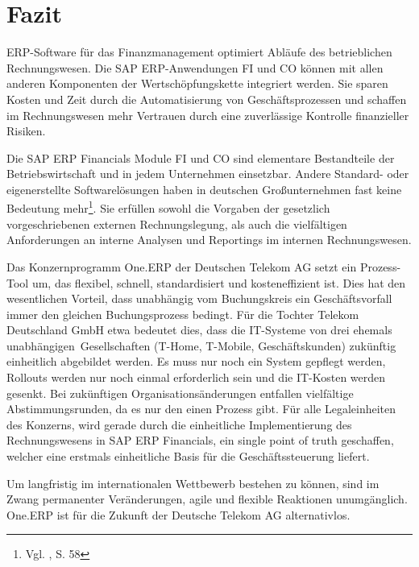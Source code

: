 \section{Fazit}
ERP-Software für das Finanzmanagement optimiert Abläufe des betrieblichen Rechnungswesen. Die SAP ERP-Anwendungen FI und CO können mit allen anderen Komponenten der Wertschöpfungskette integriert werden. Sie sparen Kosten und Zeit durch die Automatisierung von Geschäftsprozessen und schaffen im Rechnungswesen mehr Vertrauen durch eine zuverlässige Kontrolle finanzieller Risiken. 

Die SAP ERP Financials Module FI und CO sind elementare Bestandteile der Betriebswirtschaft und in jedem Unternehmen einsetzbar. Andere  Standard- oder eigenerstellte Softwarelösungen haben in deutschen Großunternehmen fast keine Bedeutung mehr\footnote{Vgl. \cite{Gleich2010}, S. 58}. Sie erfüllen sowohl die Vorgaben der gesetzlich vorgeschriebenen externen Rechnungslegung, als auch die vielfältigen Anforderungen an interne Analysen und Reportings im internen Rechnungswesen. 

Das Konzernprogramm One.ERP der Deutschen Telekom AG setzt ein Prozess-Tool um, das flexibel, schnell, standardisiert und kosteneffizient ist. Dies hat den wesentlichen Vorteil, dass unabhängig vom Buchungskreis ein Geschäftsvorfall immer den gleichen Buchungsprozess bedingt. Für die Tochter Telekom Deutschland GmbH etwa bedeutet dies, dass die IT-Systeme von drei ehemals \glqq unabhängigen\grqq \ Gesellschaften (T-Home, T-Mobile, Geschäftskunden) zukünftig einheitlich abgebildet werden. Es muss nur noch ein System gepflegt werden, Rollouts werden nur noch einmal erforderlich sein und die IT-Kosten werden gesenkt. Bei zukünftigen Organisationsänderungen entfallen vielfältige Abstimmungsrunden, da es nur den einen Prozess gibt. Für alle Legaleinheiten des Konzerns, wird gerade durch die einheitliche Implementierung des Rechnungswesens in SAP ERP Financials, ein single point of truth geschaffen, welcher eine erstmals einheitliche Basis für die Geschäftssteuerung liefert.

Um langfristig im internationalen Wettbewerb bestehen zu können, sind im Zwang permanenter Veränderungen, agile und flexible Reaktionen unumgänglich. One.ERP ist für die Zukunft der Deutsche Telekom AG alternativlos.